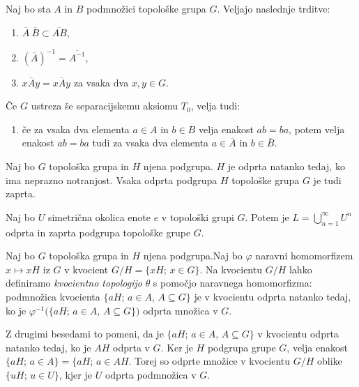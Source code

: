 \documentclass[mat1]{fmfdelo}
\newcommand{\closure}[1]{\overline{#1}}
\begin{document}
\begin{trditev}\label{trd:zaprtost}
Naj bo sta $A$ in $B$ podmnožici topološke grupa $G$. Veljajo naslednje trditve:
\begin{enumerate}
\item $\closure{A}\ \closure{B} \subset \closure{A B}$,
\item $(\closure{A})^{-1} = \closure{A^{-1}}$,
\item $x \closure{A} y = \closure{x A y}$ za vsaka dva $x, y \in G$.
\end{enumerate}

Če $G$ ustreza še separacijskemu aksiomu $T_0$, velja tudi:
\begin{enumerate}[resume]
\item če za vsaka dva elementa $a \in A$ in $b \in B$ velja enakost $ab = ba$, potem velja enakost $ab = ba$ tudi za vsaka dva elementa $a \in \closure{A}$ in $b \in \closure{B}$.
\end{enumerate}
\end{trditev}

\begin{trditev}\label{trd:odpzap}
Naj bo $G$ topološka grupa in $H$ njena podgrupa. $H$ je odprta natanko tedaj, ko ima neprazno notranjost. Vsaka odprta podgrupa $H$ topološke grupa $G$ je tudi zaprta.
\end{trditev}

\begin{trditev}\label{trd:podgrupaunija}
Naj bo $U$ simetrična okolica enote $e$ v topološki grupi $G$. Potem je $L = \bigcup_{n=1}^{\infty} U^n$ odprta in zaprta podgrupa topološke grupe $G$.
\end{trditev}

\begin{definicija}\label{def:kvocientnatop}
Naj bo $G$ topološka grupa in $H$ njena podgrupa.Naj bo $\varphi$ naravni homomorfizem $x \mapsto xH$ iz $G$ v kvocient $G/H = \lbrace xH$; $x \in G \rbrace$. Na kvocientu $G/H$ lahko definiramo \emph{kvocientno topologijo} $\theta$ s pomočjo naravnega homomorfizma: podmnožica kvocienta $\lbrace aH$; $a \in A$, $A \subseteq G \rbrace$ je v kvocientu odprta natanko tedaj, ko je $\varphi^{-1}(\lbrace aH$; $a \in A$, $A \subseteq G \rbrace)$ odprta množica v $G$.
\end{definicija}

\begin{opomba}
Z drugimi besedami to pomeni, da je $\lbrace aH$; $a \in A$, $A \subseteq G \rbrace$ v kvocientu odprta natanko tedaj, ko je $AH$ odprta v $G$. Ker je $H$ podgrupa grupe $G$, velja enakost $\lbrace aH$; $a \in A \rbrace = \lbrace aH$; $a \in AH$. Torej so odprte množice v kvocientu $G/H$ oblike $\lbrace uH$; $u \in U \rbrace$, kjer je $U$ odprta podmnožica v $G$.
\end{opomba}
\end{document}
